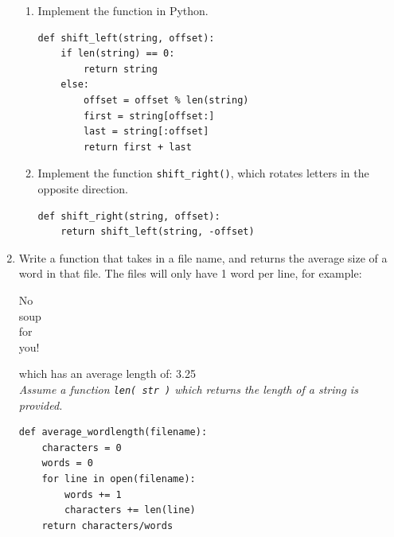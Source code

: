 \documentclass[11pt]{article}
\newenvironment{answer}{\large\lstset{basicstyle=\large}\color{white}}{}
\newenvironment{answer}{\large\lstset{basicstyle=\large}\color{red}}{}
\begin{document}
\begin{enumerate}
\begin{enumerate}
        \item Implement the function in Python.

\begin{answer}
\begin{lstlisting}
def shift_left(string, offset):
    if len(string) == 0:
        return string
    else:
        offset = offset % len(string)
        first = string[offset:]
        last = string[:offset]
        return first + last
\end{lstlisting}
\end{answer}

        \item Implement the function {\tt shift\_right()}, which rotates letters
            in the opposite direction.

\begin{answer}
\begin{lstlisting}
def shift_right(string, offset):
    return shift_left(string, -offset)
\end{lstlisting}
\vspace{0.5in}
\end{answer}

    \end{enumerate}

\vfill
\pagebreak

    \item Write a function that takes in a file name, and returns the average
        size of a word in that file. The files will only have 1 word per line,
        for example:

        \begin{center}
        No\\
        soup\\
        for\\
        you!
        \end{center}

        which has an average length of: 3.25 \\ \emph{Assume a function \texttt{len( str )} which returns the length of a string is provided.}


\begin{answer}
\begin{lstlisting}
def average_wordlength(filename):
    characters = 0
    words = 0
    for line in open(filename):
        words += 1
        characters += len(line)
    return characters/words
\end{lstlisting}
\end{answer}


\end{enumerate}
\end{document}

